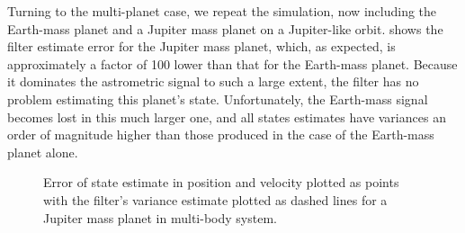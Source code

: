 Turning to the multi-planet case, we repeat the simulation, now including the Earth-mass planet and a Jupiter mass planet on a Jupiter-like orbit.    shows the filter estimate error for the Jupiter mass planet, which, as expected, is approximately a factor of 100 lower than that for the Earth-mass planet.  Because it dominates the astrometric signal to such a large extent, the filter has no problem estimating this planet's state.  Unfortunately, the Earth-mass signal becomes lost in this much larger one, and all states estimates have variances an order of magnitude higher than those produced in the case of the Earth-mass planet alone.
\begin{figure}[ht!]
 \begin{center}
 \end{center}
 \caption[Filter estimated error for a Jupiter mass planet]{ \label{fig:jup_mass_err}
	Error of state estimate in  position and velocity plotted as points with the filter's variance estimate plotted as dashed lines for a Jupiter mass planet in multi-body system.}
\end{figure}

